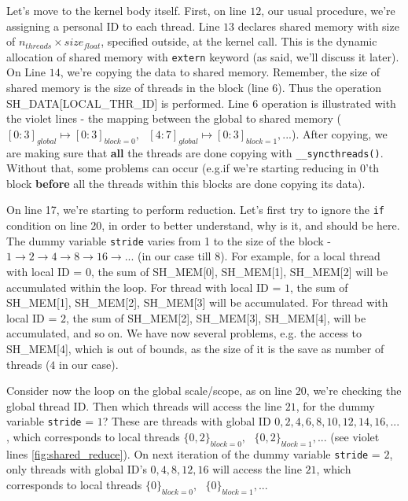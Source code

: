 Let's move to the kernel body itself. First, on line $12$, our usual procedure, we're assigning a personal 
ID to each thread. Line $13$ declares shared memory with size of $n_{threads}\times size_{float}$, specified outside, 
at the kernel call. This is the dynamic allocation of shared memory with \verb|extern| keyword 
(as said, we'll discuss it later). On Line $14$, we're copying the data to shared memory. Remember, 
the size of shared memory is the size of threads in the block (line $6$). Thus the operation 
SH\_DATA[LOCAL\_THR\_ID] is performed. Line $6$ operation is illustrated with the violet lines - the
mapping between the global to shared memory ($[0:3]_{global}\mapsto [0:3]_{block=0},\text{ } [4:7]_{global}\mapsto [0:3]_{block=1}, \text{...} $).
After copying, we are making sure that \textbf{all} the threads are done copying with \verb|__syncthreads()|. Without that, some problems can occur 
(e.g.if we're starting reducing in 0'th block \textbf{before} all the threads within this blocks are done copying its data).

On line 17, we're starting to perform reduction. Let's first try to ignore the \verb|if| 
condition on line $20$, in order to better understand, why is it, and should be here. The 
dummy variable \verb|stride| varies from 1 to the size of the block -
$1\to 2\to 4\to 8\to 16 \to ...$ (in our case till $8$).%
For example, for a local thread with local ID = $0$, the sum of SH\_MEM[0], SH\_MEM[1], SH\_MEM[2] will be accumulated 
within the loop. For thread with local ID = $1$, the sum of SH\_MEM[1], SH\_MEM[2], SH\_MEM[3] will be accumulated. For
thread with local ID = $2$, the sum of SH\_MEM[2], SH\_MEM[3], SH\_MEM[4], will be accumulated, and so on. 
We have now several problems, e.g. the access to SH\_MEM[4], which is out of bounds, as the size of it is the 
save as number of threads ($4$ in our case). 

Consider now the loop on the global scale/scope, as on line $20$, 
we're checking the global thread ID. Then which threads will access the line $21$, for the dummy variable \verb|stride| = $1$? 
These are threads with global ID $0,2,4,6,8,10,12,14,16, ... $, which corresponds to local threads
$\{0,2\}_{block=0},\text{ }\{0,2\}_{block=1}, ...$ (see violet lines \autoref{fig:shared_reduce}). 
On next iteration of the dummy variable \verb|stride| = $2$, only threads with global 
ID's $0,4,8,12,16$ will access the line $21$, which corresponds to local threads $\{0\}_{block=0},\text{ }\{0\}_{block=1}, ...$

